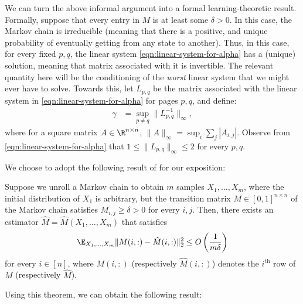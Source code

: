 We can turn the above informal argument into a formal learning-theoretic result. Formally, suppose that every entry in $M$ is at least some $\delta > 0$. In this case, the Markov chain is irreducible (meaning that there is a positive, and unique probability of eventually getting from any state to another). Thus, in this case, for every fixed $p,q$, the linear system \eqref{eqn:linear-system-for-alpha} has a (unique) solution, meaning that matrix associated with it is invertible. The relevant quantity here will be the conditioning of the \textit{worst} linear system that we might ever have to solve. Towards this, let $L_{p,q}$ be the matrix associated with the linear system in \eqref{eqn:linear-system-for-alpha} for pages $p,q$, and define:
\begin{align}
    \label{eqn:gamma-def}
    \gamma &= \sup_{p \neq q} \|L_{p,q}^{-1}\|_\infty,
\end{align}
where for a square matrix $A \in \R^{n \times n}$, $\|A\|_\infty = \sup_i \sum_{j}|A_{i,j}|$. Observe from \eqref{eqn:linear-system-for-alpha} that $1 \le \|L_{p,q}\|_\infty \le 2$ for every $p,q$.

We choose to adopt the following result of \cite{hao2018learning} for our exposition:

\begin{theorem}
    \label{thm:learning-markov-chains}
    Suppose we unroll a Markov chain to obtain $m$ samples $X_1,\dots,X_m$, where the initial distribution of $X_1$ is arbitrary, but the transition matrix $M \in [0,1]^{n \times n}$ of the Markov chain satisfies $M_{i,j} \ge \delta > 0$ for every $i,j$. Then, there exists an estimator $\hat{M}=\hat{M}(X_1,\dots,X_m)$ that satisfies
    \begin{align*}
        \E_{X_1,\dots,X_m}\|M(i,:) - \hat{M}(i,:)\|_2^2 \le O \left(\frac{1}{m\delta}\right)
    \end{align*}
    for every $i \in [n]$, where $M(i,:)$ (respectively $\hat{M}(i,:)$) denotes the $i^\text{th}$ row of $M$ (respectively $\hat{M}$).
\end{theorem}

Using this theorem, we can obtain the following result:

